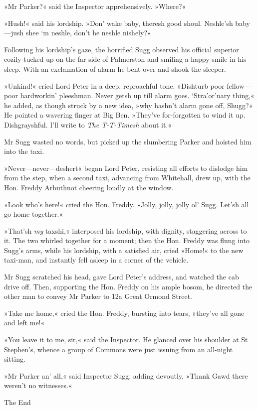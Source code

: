»Mr Parker?« said the Inspector apprehensively. »Where?«

»Hush!« said his lordship. »Don' wake baby, theresh good shoul.  Neshle'sh baby—jush shee `m neshle, don't he neshle nishely?«

Following his lordship's gaze, the horrified Sugg observed his official superior cozily tucked up on the far side of Palmerston and smiling a happy smile in his sleep. With an exclamation of alarm he bent over and shook the sleeper.

»Unkind!« cried Lord Peter in a deep, reproachful tone. »Dishturb poor fellow—poor hardworkin' pleeshman. Never getsh up till alarm goes\textellipsis .  `Stra'or'nary thing,« he added, as though struck by a new idea, »why hashn't alarm gone off, Shugg?« He pointed a wavering finger at Big Ben. »They've for-forgotten to wind it up. Dishgrayshful. I'll write to \textit{The T-T-Timesh} about it.«

Mr Sugg wasted no words, but picked up the slumbering Parker and hoisted him into the taxi.

»Never—never—deshert\longdash« began Lord Peter, resisting all efforts to dislodge him from the step, when a second taxi, advancing from Whitehall, drew up, with the Hon. Freddy Arbuthnot cheering loudly at the window.

»Look who's here!« cried the Hon. Freddy. »Jolly, jolly, jolly ol' Sugg. Let'sh all go home together.«

»That'sh \textit{my} taxshi,« interposed his lordship, with dignity, staggering across to it. The two whirled together for a moment; then the Hon. Freddy was flung into Sugg's arms, while his lordship, with a satisfied air, cried »Home!« to the new taxi-man, and instantly fell asleep in a corner of the vehicle.

Mr Sugg scratched his head, gave Lord Peter's address, and watched the cab drive off. Then, supporting the Hon. Freddy on his ample bosom, he directed the other man to convey Mr Parker to 12a Great Ormond Street.

»Take me home,« cried the Hon. Freddy, bursting into tears, »they've all gone and left me!«

»You leave it to me, sir,« said the Inspector. He glanced over his shoulder at St Stephen's, whence a group of Commons were just issuing from an all-night sitting.

»Mr Parker an' all,« said Inspector Sugg, adding devoutly, »Thank Gawd there weren't no witnesses.«
\vfill

\begin{center}\mytitlefont\reasonablyhuge
	The End
\end{center}
